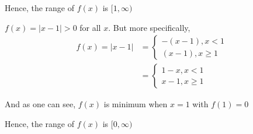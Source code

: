 \documentclass[14pt,fleqn]{extarticle}
\newcommand\fx{\vert x-1\vert}
\begin{document}
\begin{problem}
\begin{step}
\begin{options}
Hence, the range of $f(x)$ is $[1,\infty)$ 


	\end{options}
	\reason

$f(x) = \fx > 0$ for all $x$. But more specifically, 
	\begin{align}
	f(x) = \vert x-1\vert &= \begin{cases}
       -(x-1), x< 1 \\
       (x-1), x\geq 1
     \end{cases} \\
     &= \begin{cases}
       1-x, x< 1 \\
       x-1, x\geq 1
     \end{cases} 
\end{align}
     
     And as one can see, $f(x)$ is minimum when $x=1$ with $f(1) = 0$\newline
     
     Hence, the range of $f(x)$ is $[0,\infty)$
     
\end{step}
\end{problem}
\end{document}
